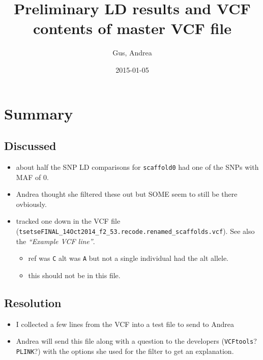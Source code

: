 \documentclass[letterpaper]{scrartcl}
\title{Preliminary LD results and VCF contents of master VCF file}
\author{Gus, Andrea}
\date{2015-01-05}
\begin{document}
\maketitle

{
\hypersetup{linkcolor=black}
\setcounter{tocdepth}{3}
\tableofcontents
}
\section{Summary}\label{summary}

\subsection{Discussed}\label{discussed}

\begin{itemize}
\itemsep1pt\parskip0pt
\item
  about half the SNP LD comparisons for \texttt{scaffold0} had one of
  the SNPs with MAF of 0.
\item
  Andrea thought she filtered these out but SOME seem to still be there
  ovbiously.
\item
  tracked one down in the VCF file
  (\texttt{tsetseFINAL\_14Oct2014\_f2\_53.recode.renamed\_scaffolds.vcf}).
  See also the \emph{``Example VCF line''}.

  \begin{itemize}
  \itemsep1pt\parskip0pt
  \item
    ref was \texttt{C} alt was \texttt{A} but not a single individual
    had the alt allele.
  \item
    this should not be in this file.
  \end{itemize}
\end{itemize}

\subsection{Resolution}\label{resolution}

\begin{itemize}
\itemsep1pt\parskip0pt
\item
  I collected a few lines from the VCF into a test file to send to
  Andrea
\item
  Andrea will send this file along with a question to the developers
  (\texttt{VCFtools}? \texttt{PLINK}?) with the options she used for the
  filter to get an explanation.
\end{itemize}
\end{document}
